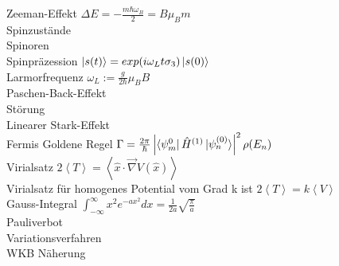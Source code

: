 \documentclass{article}
\begin{document}
Zeeman-Effekt $\Delta E = - \frac{m \hbar \omega_B}{2} = B \mu_B m$ \\

Spinzust\"ande \\

Spinoren \\

Spinpr\"azession $\ket{s(t)} = exp(i \omega_L t \sigma_3) \ket{s(0)} $ \\

Larmorfrequenz $\omega_L := \frac{g}{2 \hbar} \mu_B B$ \\

Paschen-Back-Effekt \\

St\"orung \\

Linearer Stark-Effekt \\

Fermis Goldene Regel $\Gamma = \frac{2\pi}{\hbar} \left| \bra{\psi_m^{0}} \hat{H}^{(1)} \ket{\psi_n^{(0)}} \right|^2 \rho(E_n) $\\

Virialsatz $2 \left< T \right> = \left< \hat{x} \cdot \vec{\nabla}V(\hat{x}) \right> $ \\

Virialsatz f\"ur homogenes Potential vom Grad k ist $2 \left< T \right> = k \left< V \right> $ \\

Gauss-Integral $ \int_{-\infty}^{\infty}x^2e^{-ax^2} dx = \frac{1}{2a} \sqrt{\frac{\pi}{a}}$ \\

Pauliverbot \\

Variationsverfahren \\

WKB N\"aherung \\
\end{document}
